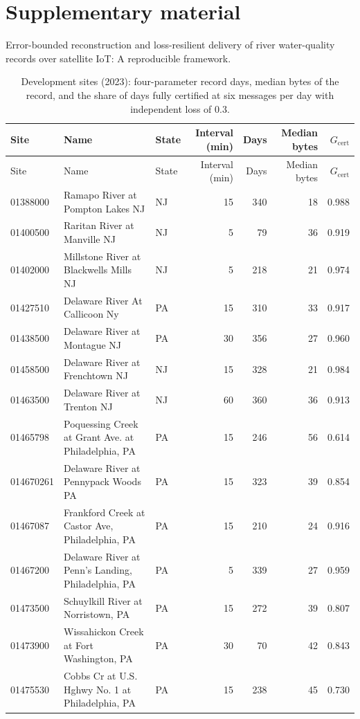 \documentclass[11pt]{article}
\begin{document}
\section*{Supplementary material}
Error-bounded reconstruction and loss-resilient delivery of river water-quality records over satellite IoT: A reproducible framework.

\begin{longtable}{@{}lp{6.2cm}lrrrr@{}}
\caption{Development sites (2023): four-parameter record days, median bytes of the record, and the share of days fully certified at six messages per day with independent loss of 0.3.}\label{tab:s1}\\
\toprule
Site & Name & State & Interval (min) & Days & Median bytes & $G_{\mathrm{cert}}$\\
\midrule
\endfirsthead
\toprule
Site & Name & State & Interval (min) & Days & Median bytes & $G_{\mathrm{cert}}$\\
\midrule
\endhead
01388000 & Ramapo River at Pompton Lakes NJ & NJ & 15 & 340 & 18 & 0.988 \\
01400500 & Raritan River at Manville NJ & NJ & 5 & 79 & 36 & 0.919 \\
01402000 & Millstone River at Blackwells Mills NJ & NJ & 5 & 218 & 21 & 0.974 \\
01427510 & Delaware River At Callicoon Ny & PA & 15 & 310 & 33 & 0.917 \\
01438500 & Delaware River at Montague NJ & PA & 30 & 356 & 27 & 0.960 \\
01458500 & Delaware River at Frenchtown NJ & NJ & 15 & 328 & 21 & 0.984 \\
01463500 & Delaware River at Trenton NJ & NJ & 60 & 360 & 36 & 0.913 \\
01465798 & Poquessing Creek at Grant Ave. at Philadelphia, PA & PA & 15 & 246 & 56 & 0.614 \\
014670261 & Delaware River at Pennypack Woods PA & PA & 15 & 323 & 39 & 0.854 \\
01467087 & Frankford Creek at Castor Ave, Philadelphia, PA & PA & 15 & 210 & 24 & 0.916 \\
01467200 & Delaware River at Penn's Landing, Philadelphia, PA & PA & 5 & 339 & 27 & 0.959 \\
01473500 & Schuylkill River at Norristown, PA & PA & 15 & 272 & 39 & 0.807 \\
01473900 & Wissahickon Creek at Fort Washington, PA & PA & 30 & 70 & 42 & 0.843 \\
01475530 & Cobbs Cr at U.S. Hghwy No. 1 at Philadelphia, PA & PA & 15 & 238 & 45 & 0.730 \\

\end{longtable}
\end{document}
